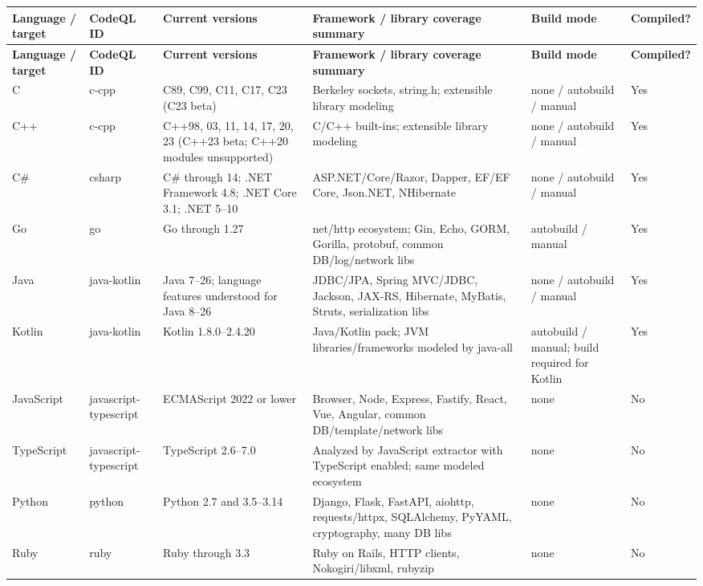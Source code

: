 \documentclass[10pt,letterpaper]{article}
\begin{document}
\begin{landscape}
\scriptsize
\setlength{\tabcolsep}{3pt}
\begin{longtable}{@{}P{0.72in}P{0.9in}P{1.45in}P{3.55in}P{1.25in}P{0.65in}@{}}
\toprule
\textbf{Language / target} & \textbf{CodeQL ID} & \textbf{Current versions} & \textbf{Framework / library coverage summary} & \textbf{Build mode} & \textbf{Compiled?}\\
\midrule
\endfirsthead
\toprule
\textbf{Language / target} & \textbf{CodeQL ID} & \textbf{Current versions} & \textbf{Framework / library coverage summary} & \textbf{Build mode} & \textbf{Compiled?}\\
\midrule
\endhead
C & c-cpp & C89, C99, C11, C17, C23 (C23 beta) & Berkeley sockets, string.h; extensible library modeling & none / autobuild / manual & Yes\\
C++ & c-cpp & C++98, 03, 11, 14, 17, 20, 23 (C++23 beta; C++20 modules unsupported) & C/C++ built-ins; extensible library modeling & none / autobuild / manual & Yes\\
C\# & csharp & C\# through 14; .NET Framework 4.8; .NET Core 3.1; .NET 5--10 & ASP.NET/Core/Razor, Dapper, EF/EF Core, Json.NET, NHibernate & none / autobuild / manual & Yes\\
Go & go & Go through 1.27 & net/http ecosystem; Gin, Echo, GORM, Gorilla, protobuf, common DB/log/network libs & autobuild / manual & Yes\\
Java & java-kotlin & Java 7--26; language features understood for Java 8--26 & JDBC/JPA, Spring MVC/JDBC, Jackson, JAX-RS, Hibernate, MyBatis, Struts, serialization libs & none / autobuild / manual & Yes\\
Kotlin & java-kotlin & Kotlin 1.8.0--2.4.20 & Java/Kotlin pack; JVM libraries/frameworks modeled by java-all & autobuild / manual; build required for Kotlin & Yes\\
JavaScript & javascript-typescript & ECMAScript 2022 or lower & Browser, Node, Express, Fastify, React, Vue, Angular, common DB/template/network libs & none & No\\
TypeScript & javascript-typescript & TypeScript 2.6--7.0 & Analyzed by JavaScript extractor with TypeScript enabled; same modeled ecosystem & none & No\\
Python & python & Python 2.7 and 3.5--3.14 & Django, Flask, FastAPI, aiohttp, requests/httpx, SQLAlchemy, PyYAML, cryptography, many DB libs & none & No\\
Ruby & ruby & Ruby through 3.3 & Ruby on Rails, HTTP clients, Nokogiri/libxml, rubyzip & none & No\\

\end{longtable}
\end{landscape}
\end{document}
